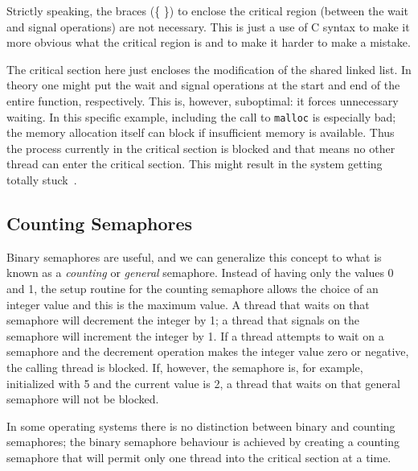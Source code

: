 Strictly speaking, the braces (\{ \}) to enclose the critical region (between the wait and signal operations) are not necessary. This is just a use of C syntax to make it more obvious what the critical region is and to make it harder to make a mistake.

The critical section here just encloses the modification of the shared linked list. In theory one might put the wait and signal operations at the start and end of the entire function, respectively. This is, however, suboptimal: it forces unnecessary waiting. In this specific example, including the call to \texttt{malloc} is especially bad; the memory allocation itself can block if insufficient memory is available. Thus the process currently in the critical section is blocked and that means no other thread can enter the critical section. This might result in the system getting totally stuck~\cite{mte241}.

\subsection*{Counting Semaphores}
Binary semaphores are useful, and we can generalize this concept to what is known as a \textit{counting} or \textit{general} semaphore. Instead of having only the values 0 and 1, the setup routine for the counting semaphore allows the choice of an integer value and this is the maximum value. A thread that waits on that semaphore will decrement the integer by 1; a thread that signals on the semaphore will increment the integer by 1. If a thread attempts to wait on a semaphore and the decrement operation makes the integer value zero or negative, the calling thread is blocked. If, however, the semaphore is, for example, initialized with 5 and the current value is 2, a thread that waits on that general semaphore will not be blocked.

In some operating systems there is no distinction between binary and counting semaphores; the binary semaphore behaviour is achieved by creating a counting semaphore that will permit only one thread into the critical section at a time. 




